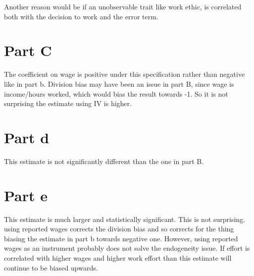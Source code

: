 \documentclass[11pt]{article}
\begin{document}
Another reason would be if an unobservable trait like work ethic, is correlated both with the decision to work and the error term. 

\begin{center}
	
\end{center}



\section*{Part C}

The coefficient on wage is positive under this specification rather than negative like in part b. Division bias may have been an issue in part B, since wage is income/hours worked, which would bias the result towards -1. So it is not surprising the estimate using IV is higher. 


\begin{center}
	
\end{center}



\section*{Part d}

This estimate is not significantly different than the one in part B. 

\begin{center}
	\centering
	
\end{center}


\section*{Part e}
This estimate is much larger and statistically significant. This is not surprising. 
using reported wages corrects the division bias and so corrects for the thing biasing the estimate in part b towards negative one. However, using reported wages as an instrument probably does not solve the endogeneity  issue. If effort is correlated with higher wages and higher work effort than this estimate will continue to be biased upwards. 


\begin{center}
	
\end{center}
\end{document}
